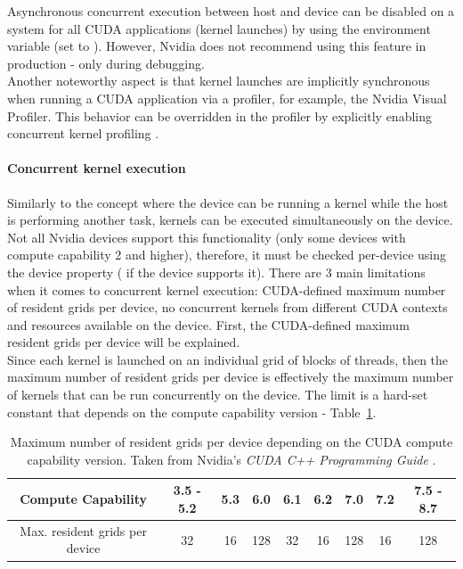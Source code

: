 Asynchronous concurrent execution between host and device can be disabled on a system for all CUDA applications (kernel launches) by using the  environment variable (set to ). However, Nvidia does not recommend using this feature in production - only during debugging. \\
Another noteworthy aspect is that kernel launches are implicitly synchronous when running a CUDA application via a profiler, for example, the Nvidia Visual Profiler. This behavior can be overridden in the profiler by explicitly enabling concurrent kernel profiling \cite{NVIDIAMay2022}.

\paragraph{Concurrent kernel execution}\label{Paragraph:CUDA-asynchronous-concurrent-execution-concurrent-kernel-execution}
Similarly to the concept where the device can be running a kernel while the host is performing another task, kernels can be executed simultaneously on the device. Not all Nvidia devices support this functionality (only some devices with compute capability 2 and higher), therefore, it must be checked per-device using the  device property ( if the device supports it). There are 3 main limitations when it comes to concurrent kernel execution: CUDA-defined maximum number of resident grids per device, no concurrent kernels from different CUDA contexts and resources available on the device. First, the CUDA-defined maximum resident grids per device will be explained. \\
Since each kernel is launched on an individual grid of blocks of threads, then the maximum number of resident grids per device is effectively the maximum number of kernels that can be run concurrently on the device. The limit is a hard-set constant that depends on the compute capability version - Table~\ref{Table:CUDA-maximum-resident-grids-per-device}.

\begin{table}[h!]
	\centering
	\renewcommand{\arraystretch}{1.5}
	\begin{tabular}{ |c|c|c|c|c|c|c|c|c| } 
		\hline
		Compute Capability & 3.5 - 5.2 & 5.3 & 6.0 & 6.1 & 6.2 & 7.0 & 7.2 & 7.5 - 8.7 \\
		\hline
		Max. resident grids per device & 32 & 16 & 128 & 32 & 16 & 128 & 16 & 128 \\
		\hline
	\end{tabular}
	\caption{Maximum number of resident grids per device depending on the CUDA compute capability version. Taken from Nvidia's \emph{CUDA C++ Programming Guide} \cite{NVIDIAMay2022}.}
	\label{Table:CUDA-maximum-resident-grids-per-device}
\end{table}

